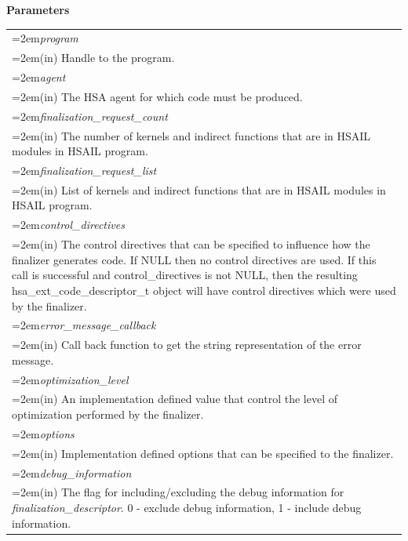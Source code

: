 \documentclass[final]{book}
\newcommand{\hsaarg}[1]{\textit{#1}}
\begin{document}
\noindent\textbf{Parameters}\\[-6mm]
\noindent\begin{longtable}{@{}>{\hangindent=2em}p{\textwidth}}
\hsaarg{program}\\\hspace{2em}(in) Handle to the program.\\[2mm]
\hsaarg{agent}\\\hspace{2em}(in) The HSA agent for which code must be produced.\\[2mm]
\hsaarg{finalization_\-request_\-count}\\\hspace{2em}(in) The number of kernels and indirect functions that are in HSAIL modules in HSAIL program.\\[2mm]
\hsaarg{finalization_\-request_\-list}\\\hspace{2em}(in) List of kernels and indirect functions that are in HSAIL modules in HSAIL program.\\[2mm]
\hsaarg{control_\-directives}\\\hspace{2em}(in) The control directives that can be specified to influence how the finalizer generates code. If NULL then no control directives are used. If this call is successful and control_\-directives is not NULL, then the resulting hsa_\-ext_\-code_\-descriptor_\-t object will have control directives which were used by the finalizer.\\[2mm]
\hsaarg{error_\-message_\-callback}\\\hspace{2em}(in) Call back function to get the string representation of the error message.\\[2mm]
\hsaarg{optimization_\-level}\\\hspace{2em}(in) An implementation defined value that control the level of optimization performed by the finalizer.\\[2mm]
\hsaarg{options}\\\hspace{2em}(in) Implementation defined options that can be specified to the finalizer.\\[2mm]
\hsaarg{debug_\-information}\\\hspace{2em}(in) The flag for including/excluding the debug information for \textit{finalization_\-descriptor}. 0 - exclude debug information, 1 - include debug information.
\end{longtable}
\end{document}
